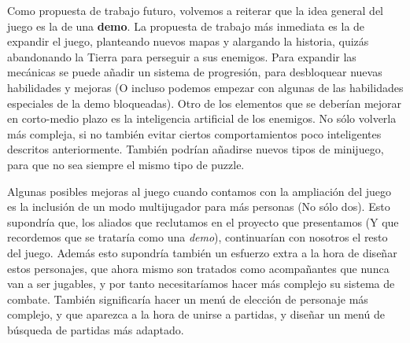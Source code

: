 Como propuesta de trabajo futuro, volvemos a reiterar que la idea general del juego es la de una \textbf{demo}. La propuesta de trabajo más inmediata es la de expandir el juego, planteando nuevos mapas y alargando la historia, quizás abandonando la Tierra para perseguir a sus enemigos. Para expandir las mecánicas se puede añadir un sistema de progresión, para desbloquear nuevas habilidades y mejoras (O incluso podemos empezar con algunas de las habilidades especiales de la demo bloqueadas). Otro de los elementos que se deberían mejorar en corto-medio plazo es la inteligencia artificial de los enemigos. No sólo volverla más compleja, si no también evitar ciertos comportamientos poco inteligentes descritos anteriormente. También podrían añadirse nuevos tipos de minijuego, para que no sea siempre el mismo tipo de puzzle.
\\

\pagestyle{notsection}

Algunas posibles mejoras al juego cuando contamos con la ampliación del juego es la inclusión de un modo multijugador para más personas (No sólo dos). Esto supondría que, los aliados que reclutamos en el proyecto que presentamos (Y que recordemos que se trataría como una \textit{demo}), continuarían con nosotros el resto del juego. Además esto supondría también un esfuerzo extra a la hora de diseñar estos personajes, que ahora mismo son tratados como acompañantes que nunca van a ser jugables, y por tanto necesitaríamos hacer más complejo su sistema de combate. También significaría hacer un menú de elección de personaje más complejo, y que aparezca a la hora de unirse a partidas, y diseñar un menú de búsqueda de partidas más adaptado.
